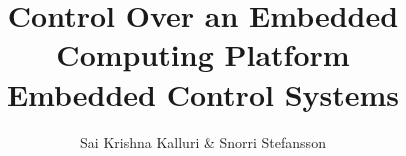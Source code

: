 \documentclass{article}
\begin{document}
\title{ {\fontsize{16}{1} \selectfont Control Over an Embedded Computing Platform} {\\ \fontsize{13}{1} \selectfont \textbf{Embedded Control Systems}} }
\author{Sai Krishna Kalluri \& Snorri Stefansson }

\maketitle










\printbibliography
\end{document}
